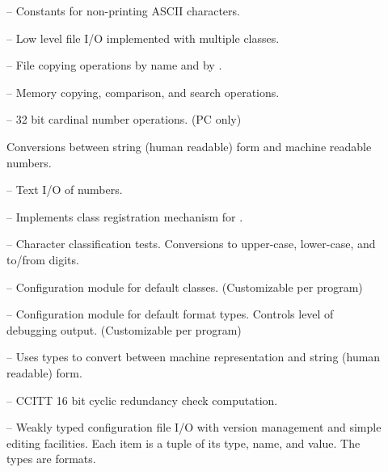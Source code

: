 \begin{description}
\item[] -- 
    Constants for non-printing ASCII characters.

\item[] -- 
    Low level file I/O implemented with multiple classes.

\item[] -- 
    File copying operations by name and by .

\item[] --
    Memory copying, comparison, and search operations. 

\item[] -- 
    32 bit cardinal number operations. (PC only)

\item[]
    Conversions between string (human readable) form and
    machine readable  numbers.

\item[] --
    Text I/O of  numbers.

\item[] --
    Implements class registration mechanism for .

\item[] --
    Character classification tests.  Conversions to upper-case, lower-case,
    and to/from  digits.

\item[] --
    Configuration module for default  classes.
    (Customizable per program)
    
\item[] --
    Configuration module for default  format types.
    Controls level of debugging output.  (Customizable per program)

\item[] --
    Uses  types to convert between machine representation
    and string (human readable) form.

\item[] --
    CCITT 16 bit cyclic redundancy check computation.

\item[] --
    Weakly typed configuration file I/O with version management and 
    simple editing facilities.  Each item is a tuple of its type, name,
    and value.  The types are  formats.


\end{description}
